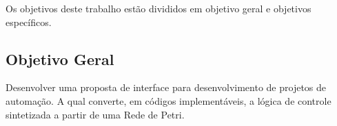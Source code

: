 





Os objetivos deste trabalho est\~ao divididos em objetivo geral e objetivos espec\'ificos.

\subsection{Objetivo Geral}

Desenvolver uma proposta de interface para desenvolvimento de projetos de automa\c{c}\~ao. A qual converte, em c\'odigos implement\'aveis, a l\'ogica de controle sintetizada a partir de uma Rede de Petri.


